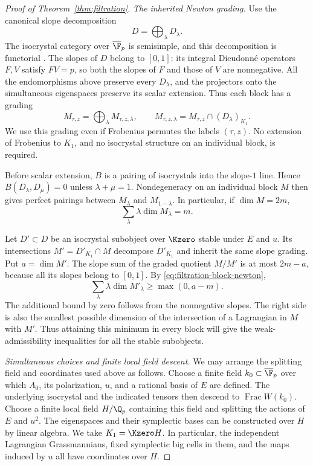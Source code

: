 \begin{proof}[Proof of Theorem~\ref{thm:filtration}]
\medskip\noindent
\emph{The inherited Newton grading.}
Use the canonical slope decomposition
\[
 D=\bigoplus_\lambda D_\lambda.
\]
The isocrystal category over $\overline{\F}_p$ is semisimple, and
this decomposition is functorial
\cite[\S3.2, Proposition~3.3]{ColmezFontaine2000}.  The slopes of $D$
belong to $[0,1]$: its integral Dieudonn\'e operators \(F,V\)
satisfy \(FV=p\), so both the slopes of \(F\) and those of \(V\)
are nonnegative.  All the endomorphisms above preserve every
$D_\lambda$, and the projectors onto the simultaneous eigenspaces
preserve its scalar extension.  Thus each block has a grading
\[
 M_{\tau,z}=\bigoplus_\lambda M_{\tau,z,\lambda},\qquad
 M_{\tau,z,\lambda}=M_{\tau,z}\cap(D_\lambda)_{K_1}.
\]
We use this grading even if Frobenius permutes the labels $(\tau,z)$.
No extension of Frobenius to $K_1$, and no isocrystal structure on an
individual block, is required.

Before scalar extension, $B$ is a pairing of isocrystals into the
slope-$1$ line.  Hence $B(D_\lambda,D_\mu)=0$ unless
$\lambda+\mu=1$.  Nondegeneracy on an individual block $M$ then gives
perfect pairings between $M_\lambda$ and $M_{1-\lambda}$.  In
particular, if $\dim M=2m$,
\begin{equation}
\label{eq:filtration-block-newton}
 \sum_\lambda\lambda\dim M_\lambda=m.
\end{equation}

Let $D'\subset D$ be an isocrystal subobject over $\Kzero$ stable
under $E$ and $u$.  Its intersections $M'=D'_{K_1}\cap M$ decompose
$D'_{K_1}$ and inherit the same slope grading.  Put $a=\dim M'$.
The slope sum of the graded quotient $M/M'$ is at most $2m-a$,
because all its slopes belong to $[0,1]$.  By
\eqref{eq:filtration-block-newton},
\begin{equation}
\label{eq:filtration-block-bound}
 \sum_\lambda\lambda\dim M'_\lambda
 \geq \max(0,a-m).
\end{equation}
The additional bound by zero follows from the nonnegative slopes.
The right side is also the smallest possible dimension of the
intersection of a Lagrangian in $M$ with $M'$.
Thus attaining this minimum in every block will give the
weak-admissibility inequalities for all the stable subobjects.

\medskip\noindent
\emph{Simultaneous choices and finite local field descent.}
We may arrange the splitting field and coordinates used above as
follows.  Choose a finite field $k_0\subset\overline{\F}_p$ over
which $A_0$, its polarization, $u$, and a rational basis of $E$ are
defined.  The underlying isocrystal and the indicated tensors then
descend to $\operatorname{Frac}W(k_0)$.  Choose a finite local field
$H/\Q_p$ containing this field and splitting the actions of $E$ and
$u^2$.  The eigenspaces and their symplectic bases can be constructed
over $H$ by linear algebra.  We take $K_1=\Kzero H$.  In particular,
the independent Lagrangian Grassmannians, fixed symplectic big cells
in them, and the maps induced by $u$ all have coordinates over $H$.


\end{proof}
